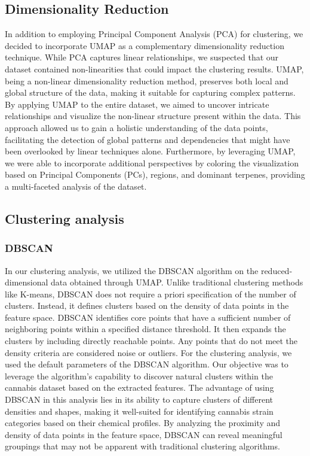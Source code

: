 \documentclass[11pt,a4paper]{article}
\begin{document}
\subsection{Dimensionality Reduction}
In addition to employing Principal Component Analysis (PCA) for clustering, we decided to incorporate UMAP as a complementary dimensionality reduction technique. While PCA captures linear relationships, we suspected that our dataset contained non-linearities that could impact the clustering results. UMAP, being a non-linear dimensionality reduction method, preserves both local and global structure of the data, making it suitable for capturing complex patterns. By applying UMAP to the entire dataset, we aimed to uncover intricate relationships and visualize the non-linear structure present within the data. This approach allowed us to gain a holistic understanding of the data points, facilitating the detection of global patterns and dependencies that might have been overlooked by linear techniques alone. Furthermore, by leveraging UMAP, we were able to incorporate additional perspectives by coloring the visualization based on Principal Components (PCs), regions, and dominant terpenes, providing a multi-faceted analysis of the dataset.


\subsection{Clustering analysis}
\subsubsection{DBSCAN}
In our clustering analysis, we utilized the DBSCAN algorithm on the reduced-dimensional data obtained through UMAP. Unlike traditional clustering methods like K-means, DBSCAN does not require a priori specification of the number of clusters. Instead, it defines clusters based on the density of data points in the feature space. DBSCAN identifies core points that have a sufficient number of neighboring points within a specified distance threshold. It then expands the clusters by including directly reachable points. Any points that do not meet the density criteria are considered noise or outliers. For the clustering analysis, we used the default parameters of the DBSCAN algorithm. Our objective was to leverage the algorithm's capability to discover natural clusters within the cannabis dataset based on the extracted features. The advantage of using DBSCAN in this analysis lies in its ability to capture clusters of different densities and shapes, making it well-suited for identifying cannabis strain categories based on their chemical profiles. By analyzing the proximity and density of data points in the feature space, DBSCAN can reveal meaningful groupings that may not be apparent with traditional clustering algorithms. \\
\end{document}
